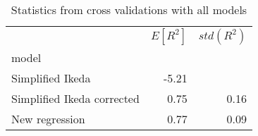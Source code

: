
\begin{table}[H]
    \centering
    \caption{Statistics from cross validations with all models}
   \begin{tabular}{lrr}
\toprule
{} &  $E[R^2]$ &  $std(R^2)$ \\
model                      &           &             \\
\midrule
Simplified Ikeda           &     -5.21 &             \\
Simplified Ikeda corrected &      0.75 &        0.16 \\
New regression             &      0.77 &        0.09 \\
\bottomrule
\end{tabular}

    \label{tab:crossvalidation}
\end{table}
    